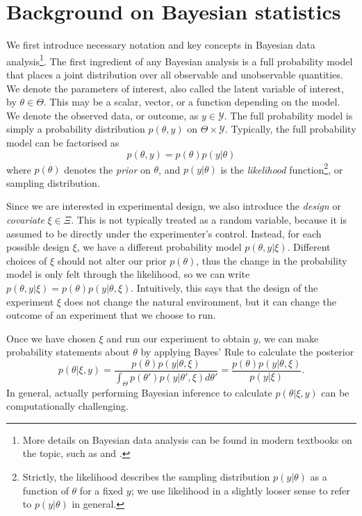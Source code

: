 \documentclass[a4paper, 10pt]{report}
\theoremstyle{plain}
\begin{document}
	
	\section{Background on Bayesian statistics}
	\label{sec:background}
	We first introduce necessary notation and key concepts in Bayesian data analysis\footnote{More details on Bayesian data analysis can be found in modern textbooks on the topic, such as \citet{gelman2013bayesian} and \citet{kruschke2014doing}.}.
	The first ingredient of any Bayesian analysis is a full probability model that places a joint distribution over all observable and unobservable quantities. We denote the parameters of interest, also called the latent variable of interest, by $\theta\in\Theta$. This may be a scalar, vector, or a function depending on the model. We denote the observed data, or outcome, as $y\in\mathcal{Y}$. The full probability model is simply a probability distribution $p(\theta,y)$ on $\Theta \times \mathcal{Y}$. Typically, the full probability model can be factorised as
	\begin{equation}
	p(\theta,y) = p(\theta)p(y|\theta)
	\end{equation}
	where $p(\theta)$ denotes the \emph{prior} on $\theta$, and $p(y|\theta)$ is the \emph{likelihood} function\footnote{Strictly, the likelihood describes the sampling distribution $p(y|\theta)$ as a function of $\theta$ for a fixed $y$; we use likelihood in a slightly looser sense to refer to $p(y|\theta)$ in general.}, or sampling distribution.
	
	Since we are interested in experimental design, we also introduce the \emph{design} or \emph{covariate} $\xi\in\Xi$. This is not typically treated as a random variable, because it is assumed to be directly under the experimenter's control. Instead, for each possible design $\xi$, we have a different probability model $p(\theta,y|\xi)$. Different choices of $\xi$ should not alter our prior $p(\theta)$, thus the change in the probability model is only felt through the likelihood, so we can write $p(\theta,y|\xi)=p(\theta)p(y|\theta,\xi)$. 
	Intuitively, this says that the design of the experiment $\xi$ does not change the natural environment, but it can change the outcome of an experiment that we choose to run.
	
	Once we have chosen $\xi$ and run our experiment to obtain $y$, we can make probability statements about $\theta$ by applying Bayes' Rule to calculate the posterior 
	\begin{equation}
	\label{eq:bayes}
	p(\theta|\xi,y) = \frac{p(\theta)p(y|\theta,\xi)}{\int_\Theta p(\theta')p(y|\theta',\xi)d\theta'} = \frac{p(\theta)p(y|\theta,\xi)}{p(y|\xi)}.
	\end{equation}
	In general, actually performing Bayesian inference to calculate $p(\theta|\xi,y)$ can be computationally challenging.
	
\end{document}
